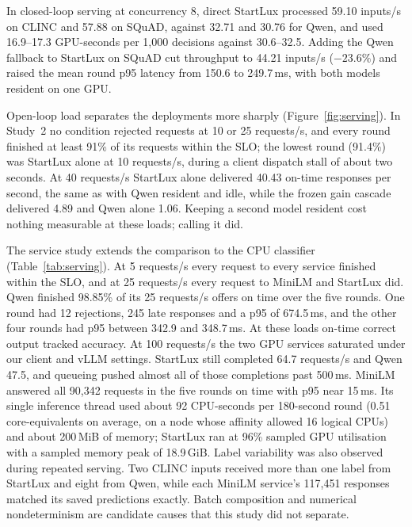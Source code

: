\documentclass[11pt]{article}
\begin{document}
In closed-loop serving at concurrency 8, direct StartLux processed 59.10 inputs/s on CLINC and 57.88 on SQuAD, against 32.71 and 30.76 for Qwen, and used 16.9--17.3 GPU-seconds per 1,000 decisions against 30.6--32.5. Adding the Qwen fallback to StartLux on SQuAD cut throughput to 44.21 inputs/s ($-23.6\%$) and raised the mean round p95 latency from 150.6 to 249.7\,ms, with both models resident on one GPU.

Open-loop load separates the deployments more sharply (Figure~\ref{fig:serving}). In Study~2 no condition rejected requests at 10 or 25 requests/s, and every round finished at least 91\% of its requests within the SLO; the lowest round (91.4\%) was StartLux alone at 10 requests/s, during a client dispatch stall of about two seconds. At 40 requests/s StartLux alone delivered 40.43 on-time responses per second, the same as with Qwen resident and idle, while the frozen gain cascade delivered 4.89 and Qwen alone 1.06. Keeping a second model resident cost nothing measurable at these loads; calling it did.

The service study extends the comparison to the CPU classifier (Table~\ref{tab:serving}). At 5 requests/s every request to every service finished within the SLO, and at 25 requests/s every request to MiniLM and StartLux did. Qwen finished 98.85\% of its 25 requests/s offers on time over the five rounds. One round had 12 rejections, 245 late responses and a p95 of 674.5\,ms, and the other four rounds had p95 between 342.9 and 348.7\,ms. At these loads on-time correct output tracked accuracy. At 100 requests/s the two GPU services saturated under our client and vLLM settings. StartLux still completed 64.7 requests/s and Qwen 47.5, and queueing pushed almost all of those completions past 500\,ms. MiniLM answered all 90,342 requests in the five rounds on time with p95 near 15\,ms. Its single inference thread used about 92 CPU-seconds per 180-second round (0.51 core-equivalents on average, on a node whose affinity allowed 16 logical CPUs) and about 200\,MiB of memory; StartLux ran at 96\% sampled GPU utilisation with a sampled memory peak of 18.9\,GiB. Label variability was also observed during repeated serving. Two CLINC inputs received more than one label from StartLux and eight from Qwen, while each MiniLM service's 117,451 responses matched its saved predictions exactly. Batch composition and numerical nondeterminism are candidate causes that this study did not separate.
\end{document}
